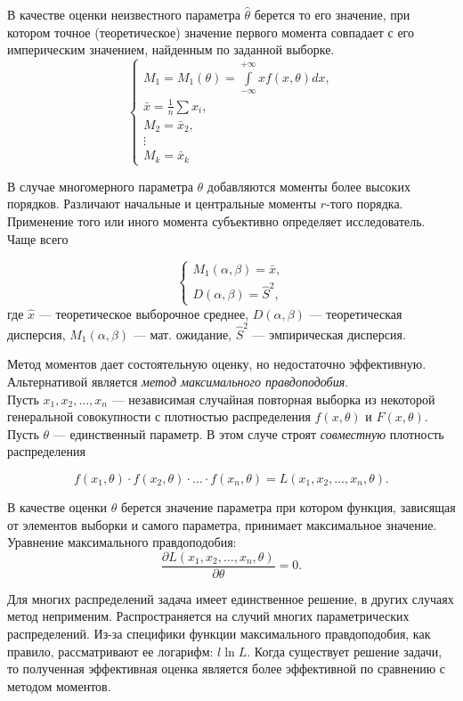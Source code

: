\documentclass[12pt]{article}
\begin{document}
В качестве оценки неизвестного параметра $\hat{\theta}$ берется то его значение, при котором точное (теоретическое) значение первого момента совпадает с его империческим значением, найденным по заданной выборке.
\[ 
\begin{cases}
    M_1 = M_1(\theta) = \int\limits_{-\infty}^{+\infty} x f(x, \theta) dx,\\
    \bar{x} = \frac{1}{n} \sum x_i,\\
    M_2 = \bar{x}_2,\\
    \vdots\\
    M_k = \bar{x}_k
\end{cases}
\]

В случае многомерного параметра $\theta$ добавляются моменты более высоких порядков. Различают начальные и центральные моменты $r$-того порядка. Применение того или иного момента субъективно определяет исследователь. Чаще всего

\[
\begin{cases}
    M_1 (\alpha, \beta) = \bar{x},\\
    D (\alpha, \beta) = \hat{S}^2,
\end{cases}
\]
где $\hat{x}$ --- теоретическое выборочное среднее, $D(\alpha, \beta)$ --- теоретическая дисперсия, $M_1 (\alpha, \beta)$ --- мат. ожидание, $\hat{S}^2$ --- эмпирическая дисперсия.

Метод моментов дает состоятельную оценку, но недостаточно эффективную. Альтернативой является \emph{метод максимального правдоподобия}.\\

Пусть $x_1, x_2, \ldots, x_n$ --- независимая случайная повторная выборка из некоторой генеральной совокупности с плотностью распределения $f(x, \theta)$ и $F(x, \theta)$. Пусть $\theta$ --- единственный параметр. В этом случе строят \emph{совместную} плотность распределения

\[ f(x_1, \theta) \cdot f(x_2, \theta) \cdot \ldots \cdot f(x_n, \theta) = L(x_1, x_2, \ldots, x_n, \theta). \]

В качестве оценки $\theta$ берется значение параметра при котором функция, зависящая от элементов выборки и самого параметра, принимает максимальное значение. Уравнение максимального правдоподобия:
\[ \frac{\partial L(x_1, x_2, \ldots, x_n, \theta)}{\partial \theta} = 0. \]

Для многих распределений задача имеет единственное решение, в других случаях метод неприменим. Распространяется на случий многих параметрических распределений. Из-за специфики функции максимального правдоподобия, как правило, рассматривают ее логарифм: $l \ln L$. Когда существует решение задачи, то полученная эффективная оценка является более эффективной по сравнению с методом моментов.
\end{document}
